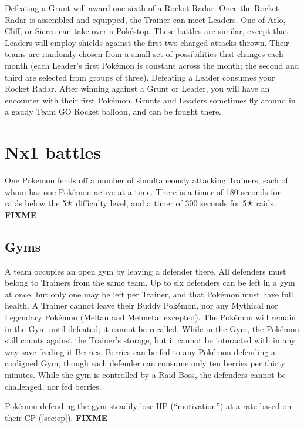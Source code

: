 Defeating a Grunt will award one-sixth of a Rocket Radar.
Once the Rocket Radar is assembled and equipped, the Trainer can meet Leaders.
One of Arlo, Cliff, or Sierra can take over a Pokéstop.
These battles are similar, except that Leaders will employ shields against the first two charged attacks thrown.
Their teams are randomly chosen from a small set of possibilities that changes each month
  (each Leader's first Pokémon is constant across the month; the second and third are selected
  from groups of three).
Defeating a Leader consumes your Rocket Radar.
After winning against a Grunt or Leader, you will have an encounter with their first Pokémon.
Grunts and Leaders sometimes fly around in a gaudy Team GO Rocket balloon,
  and can be fought there.

\section{Nx1 battles}
\label{sec:nx1}
One Pokémon fends off a number of simultaneously attacking Trainers,
  each of whom has one Pokémon active at a time.
There is a timer of 180 seconds for raids below the 5🟉 difficulty level,
  and a timer of 300 seconds for 5🟉 raids.
\textbf{FIXME}

\subsection{Gyms}
\label{sec:gyms}
A team occupies an open gym by leaving a defender there.
All defenders must belong to Trainers from the same team.
Up to six defenders can be left in a gym at once, but only one
  may be left per Trainer, and that Pokémon must have full health.
A Trainer cannot leave their Buddy Pokémon, nor any Mythical nor Legendary
  Pokémon (Meltan and Melmetal excepted).
The Pokémon will remain in the Gym until defeated; it cannot be recalled.
While in the Gym, the Pokémon still counts against the Trainer's storage,
  but it cannot be interacted with in any way save feeding it Berries.
Berries can be fed to any Pokémon defending a coaligned Gym, though
  each defender can consume only ten berries per thirty minutes.
While the gym is controlled by a Raid Boss, the defenders cannot be challenged,
  nor fed berries.

Pokémon defending the gym steadily lose HP (``motivation'') at a rate
  based on their CP (\autoref{sec:cp}).
\textbf{FIXME}

